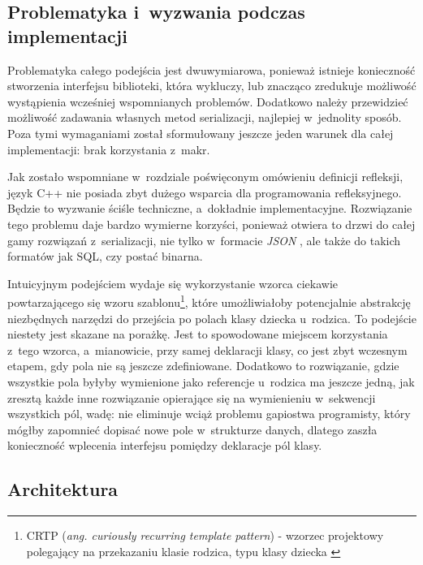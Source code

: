 \documentclass[12pt]{article}
\newcommand{\n}{\newline}
\newcommand{\nonpl}[1]{{\it #1}}
\newcommand{\ang}[1]{\nonpl{ang. #1}}
\newcommand{\JSON}{\nonpl{JSON} }
\begin{document}
{		{
			\subsection{Problematyka i~wyzwania podczas implementacji}

			Problematyka całego podejścia jest dwuwymiarowa, ponieważ istnieje konieczność stworzenia interfejsu biblioteki, która wykluczy, lub znacząco
			zredukuje możliwość wystąpienia wcześniej wspomnianych problemów. Dodatkowo należy przewidzieć możliwość zadawania własnych metod serializacji,
			najlepiej w~jednolity sposób. Poza tymi wymaganiami został sformułowany jeszcze jeden warunek dla całej implementacji: brak korzystania z~makr.\n

			Jak zostało wspomniane w~rozdziale poświęconym omówieniu definicji refleksji, język C++ nie posiada zbyt dużego wsparcia dla programowania
			refleksyjnego. Będzie to wyzwanie ściśle techniczne, a~dokładnie implementacyjne. Rozwiązanie tego problemu daje bardzo wymierne korzyści,
			ponieważ otwiera to drzwi do całej gamy rozwiązań z~serializacji, nie tylko w~formacie \JSON, ale także do takich formatów jak SQL, czy
			postać binarna.\n

			Intuicyjnym podejściem wydaje się wykorzystanie wzorca ciekawie powtarzającego się wzoru szablonu\footnote{
				CRTP (\ang{curiously recurring template pattern}) - wzorzec projektowy polegający na przekazaniu klasie rodzica, typu klasy dziecka \cite{crtp_definition}
			}, które umożliwiałoby potencjalnie abstrakcję niezbędnych narzędzi do przejścia po polach klasy dziecka u~rodzica. To podejście niestety jest skazane na
			porażkę. Jest to spowodowane miejscem korzystania z~tego wzorca, a~mianowicie, przy samej deklaracji klasy, co jest zbyt wczesnym etapem, gdy pola nie są
			jeszcze zdefiniowane. Dodatkowo to rozwiązanie, gdzie wszystkie pola byłyby wymienione jako referencje u~rodzica ma jeszcze jedną, jak zresztą każde
			inne rozwiązanie opierające się na wymienieniu w~sekwencji wszystkich pól, wadę: nie eliminuje wciąż problemu gapiostwa programisty, który mógłby zapomnieć
			dopisać nowe pole w~strukturze danych, dlatego zaszła konieczność wplecenia interfejsu pomiędzy deklaracje pól klasy.
		}

		{
			\subsection{Architektura}

}}
\end{document}
